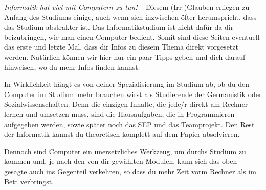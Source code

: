 
\emph{Informatik hat viel mit Computern zu tun!} -- Diesem (Irr-)Glauben erliegen zu Anfang des Studiums einige, auch wenn sich inzwischen öfter herumspricht, dass das Studium abstrakter ist. 
Das Informatikstudium ist nicht dafür da dir beizubringen, wie man einen Computer bedient. 
Somit sind diese Seiten eventuell das erste und letzte Mal, dass dir Infos zu diesem Thema direkt vorgesetzt werden. 
Natürlich können wir hier nur ein paar Tipps geben und dich darauf hinweisen, wo du mehr Infos finden kannst.

In Wirklichkeit hängt es von deiner Spezialisierung im Studium ab, ob du den Computer im Studium mehr brauchen wirst als Studierende der Germanistik oder Sozialwissenschaften. 
Denn die einzigen Inhalte, die jede/r direkt am Rechner lernen und umsetzen muss, sind die Hausaufgaben, die in Programmieren aufgegeben werden, sowie später noch das SEP und das Teamprojekt. 
Den Rest der Informatik kannst du theoretisch komplett auf dem Papier absolvieren.

Dennoch sind Computer ein unersetzliches Werkzeug, um durchs Studium zu kommen und, je nach den von dir gewählten Modulen, kann sich das oben gesagte auch ins Gegenteil verkehren, so dass du mehr Zeit vorm Rechner als im Bett verbringst.

